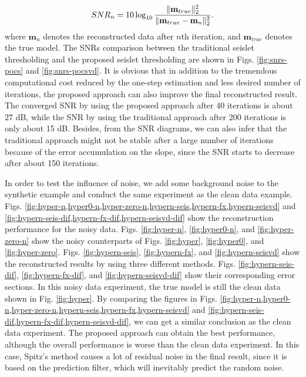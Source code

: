 \begin{equation}
\label{eq:snr}
SNR_n=10\log_{10}\frac{\Arrowvert \mathbf{m}_{true} \Arrowvert_2^2}{\Arrowvert \mathbf{m}_{true} -\mathbf{m}_n\Arrowvert_2^2}.
\end{equation}
where $\mathbf{m}_n$ denotes the reconstructed data after $n$th iteration, and $\mathbf{m}_{true}$ denotes the true model.
The SNRs comparison between the traditional seislet thresholding and the proposed seislet thresholding are shown in Figs. \ref{fig:snrs-pocs} and \ref{fig:snrs-pocsvd}. It is obvious that in addition to the tremendous computational cost reduced by the one-step estimation and less desired number of iterations, the proposed approach can also improve the final reconstructed result. The converged SNR by using the proposed approach after 40 iterations is about 27 dB, while the SNR by using the traditional approach after  200 iterations is only about 15 dB. Besides, from the SNR diagrams, we can also infer that the traditional approach might not be stable after a large number of iterations because of the error accumulation on the slope, since the SNR starts to decrease after about 150 iterations.


In order to test the influence of noise, we add some background noise to the synthetic example and conduct the same experiment as the clean data example. Figs. \ref{fig:hyper-n,hyper0-n,hyper-zero-n,hypern-seis,hypern-fx,hypern-seisvd} and \ref{fig:hypern-seis-dif,hypern-fx-dif,hypern-seisvd-dif} show the reconstruction performance for the noisy data.  Figs. \ref{fig:hyper-n}, \ref{fig:hyper0-n}, and \ref{fig:hyper-zero-n} show the noisy counterparts of Figs.  \ref{fig:hyper}, \ref{fig:hyper0}, and \ref{fig:hyper-zero}. Figs. \ref{fig:hypern-seis}, \ref{fig:hypern-fx}, and \ref{fig:hypern-seisvd} show the reconstructed results by using three different methods. Figs. \ref{fig:hypern-seis-dif}, \ref{fig:hypern-fx-dif}, and \ref{fig:hypern-seisvd-dif} show their corresponding error sections. In this noisy data experiment, the true model is still the clean data shown in Fig. \ref{fig:hyper}. By comparing the figures in Figs. \ref{fig:hyper-n,hyper0-n,hyper-zero-n,hypern-seis,hypern-fx,hypern-seisvd} and \ref{fig:hypern-seis-dif,hypern-fx-dif,hypern-seisvd-dif}, we can get a similar conclusion as the clean data experiment. The proposed approach can obtain the best performance, although the overall performance is worse than the clean data experiment. In this case, Spitz's method causes a lot of residual noise in the final result, since it is based on the prediction filter, which will inevitably predict the random noise. 

